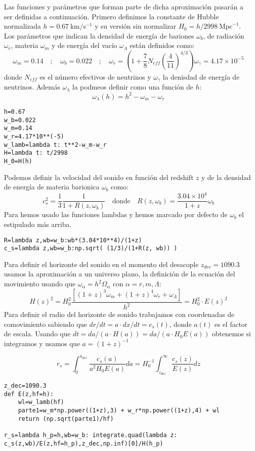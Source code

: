 \documentclass{article}
\begin{document}
Las funciones y parámetros que forman parte de dicha aproximación pasarán a ser definidas a continuación. Primero definimos la constante de Hubble normalizada $h=0.67\ \text{km}/\text{s}^{-1}$ y su versión sin normalizar $H_0=h/2998\ \text{Mpc}^{-1}$. Los parámetros que indican la densidad de energía de bariones $\omega_b$, de radiación $\omega_r$, materia $\omega_m$ y de energía del vacío $\omega_\Lambda$ están definidos como:
$$\omega_m=0.14\quad ;\quad \omega_b=0.022\quad ; \quad \omega_r=\left(1+\frac{7}{8}N_{eff}\left(\frac{4}{11}\right)^{4/3}\right)\omega_\gamma= 4.17\times 10^{-5}$$
donde $N_{eff}$ es el número efectivos de neutrinos y $\omega_\gamma$ la denisdad de energía de neutrinos. Además $\omega_\lambda$ la podmeos definir como una función de $h$:
$$\omega_\lambda(h)=h^2-\omega_m-\omega_r$$
\begin{lstlisting}[style=Python]
h=0.67
w_b=0.022
w_m=0.14
w_r=4.17*10**(-5)
w_lamb=lambda t: t**2-w_m-w_r
H=lambda t: t/2998
H_0=H(h)
\end{lstlisting}

Podemos definir la velocidad del sonido en función del redshift $z$ y de la densidad de energía de materia barionica $\omega_b$ como:
$$
c_s^2=\frac{1}{3}\frac{1}{1+R(z,\omega_b)}\quad \text{donde}\quad R(z,\omega_b)=\frac{3.04\times 10^{4}}{1+z}\omega_b
$$
Para hemos usado las funciones lambdas y hemos marcado por defecto de $\omega_b$ el estipulado más arriba.

\begin{lstlisting}[style=Python]
R=lambda z,wb=w_b:wb*(3.04*10**4)/(1+z)
c_s=lambda z,wb=w_b:np.sqrt( (1/3)/(1+R(z, wb)) )
\end{lstlisting}

Para definir el horizonte del sonido en el momento del desacople $z_{dec}=1090.3$ usamos la aproximación a un universo plano, la definición de la ecuación del movimiento usando que $\omega_\alpha=h^2\Omega_\alpha$ con $\alpha=r,m,\Lambda$:
$$
H(z)^2=H_0^2\frac{\left[(1+z)^3\omega_m+(1+z)^4\omega_r+\omega_\Lambda\right]}{h^2}=H_0^2\cdot E(z)^2
$$
Para definir el radio del horizonte de sonido trabajamos con coordenadas de comovimiento sabiendo que $dr/dt=a\cdot dx/dt=c_s(t)$, donde $a(t)$ es el factor de escala. Usando que $dt=da/(a\cdot H(a))=da/(a\cdot H_0E(a))$ obtenemos si integramos y usamos que $a=(1+z)^{-1}$

$$
r_s=\int_0^{a_{dec}}\frac{c_s(a)}{a^2H_0E(a)}da=H_0^{-1}\int_{z_{dec}}^\infty\frac{c_s(z)}{E(z)}dz 
$$

\begin{lstlisting}[style=Python]
z_dec=1090.3
def E(z,hf=h):
    wl=w_lamb(hf)
    parte1=w_m*np.power((1+z),3) + w_r*np.power((1+z),4) + wl
    return (np.sqrt(parte1)/hf)

r_s=lambda h_p=h,wb=w_b: integrate.quad(lambda z: c_s(z,wb)/E(z,hf=h_p),z_dec,np.inf)[0]/H(h_p)
\end{lstlisting}
\end{document}
